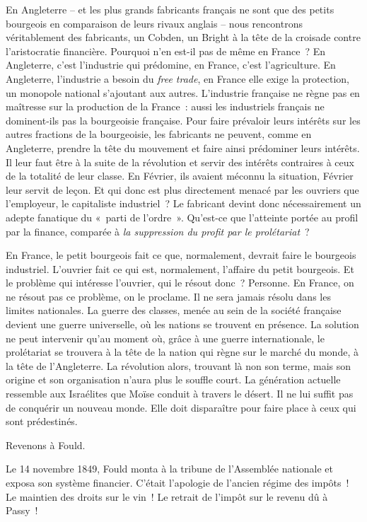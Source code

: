 \documentclass[twoside]{book} %
\begin{document}
En Angleterre – et les plus grands fabricants français ne sont que des petits bourgeois en comparaison de leurs rivaux anglais – nous rencontrons véritablement des fabricants, un Cobden, un Bright à la tête de la croisade contre l’aristocratie financière. Pourquoi n’en est-il pas de même en France ? En Angleterre, c’est l’industrie qui prédomine, en France, c’est l’agriculture. En Angleterre, l’industrie a besoin du \emph{free trade}, en France elle exige la protection, un monopole national s’ajoutant aux autres. L’industrie française ne règne pas en maîtresse sur la production de la France : aussi les industriels français ne dominent-ils pas la bourgeoisie française. Pour faire prévaloir leurs intérêts sur les autres fractions de la bourgeoisie, les fabricants ne peuvent, comme en Angleterre, prendre la tête du mouvement et faire ainsi prédominer leurs intérêts. Il leur faut être à la suite de la révolution et servir des intérêts contraires à ceux de la totalité de leur classe. En Février, ils avaient méconnu la situation, Février leur servit de leçon. Et qui donc est plus directement menacé par les ouvriers que l’employeur, le capitaliste industriel ? Le fabricant devint donc nécessairement un adepte fanatique du « parti de l’ordre ». Qu’est-ce que l’atteinte portée au profil par la finance, comparée à \emph{la suppression du profit par le prolétariat} ?\par
En France, le petit bourgeois fait ce que, normalement, devrait faire le bourgeois industriel. L’ouvrier fait ce qui est, normalement, l’affaire du petit bourgeois. Et le problème qui intéresse l’ouvrier, qui le résout donc ? Personne. En France, on ne résout pas ce problème, on le proclame. Il ne sera jamais résolu dans les limites nationales. La guerre des classes, menée au sein de la société française devient une guerre universelle, où les nations se trouvent en présence. La solution ne peut intervenir qu’au moment où, grâce à une guerre internationale, le prolétariat se trouvera à la tête de la nation qui règne sur le marché du monde, à la tête de l’Angleterre. La révolution alors, trouvant là non son terme, mais son origine et son organisation n’aura plus le souffle court. La génération actuelle ressemble aux Israélites que Moïse conduit à travers le désert. Il ne lui suffit pas de conquérir un nouveau monde. Elle doit disparaître pour faire place à ceux qui sont prédestinés.\par
Revenons à Fould.\par
Le 14 novembre 1849, Fould monta à la tribune de l’Assemblée nationale et exposa son système financier. C’était l’apologie de l’ancien régime des impôts ! Le maintien des droits sur le vin ! Le retrait de l’impôt sur le revenu dû à Passy !\par
\end{document}
